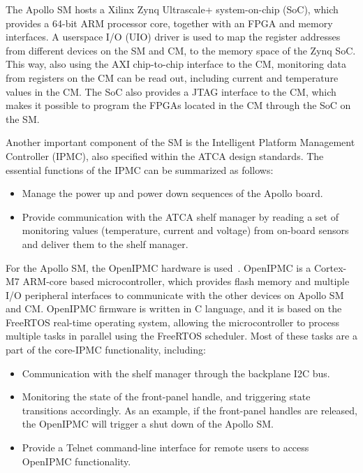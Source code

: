 The Apollo SM hosts a Xilinx Zynq Ultrascale+ system-on-chip (SoC),
which provides a 64-bit ARM processor core, together with an FPGA and memory interfaces. A userspace I/O (UIO) driver
is used to map the register addresses from different devices on the SM and CM, to the memory space of the Zynq SoC.
This way, also using the AXI chip-to-chip interface to the CM, monitoring data from registers on the CM 
can be read out, including current and temperature values in the CM. The SoC also provides a JTAG interface to the CM,
which makes it possible to program the FPGAs located in the CM through the SoC on the SM.

Another important component of the SM is the Intelligent Platform Management Controller (IPMC), also specified
within the ATCA design standards. The essential functions of the IPMC can be summarized as follows:

\begin{itemize}
    \item Manage the power up and power down sequences of the Apollo board.
    \item Provide communication with the ATCA shelf manager by reading a set of monitoring values 
    (temperature, current and voltage) from on-board sensors and deliver them to the shelf manager.
\end{itemize}

For the Apollo SM, the OpenIPMC hardware is used~\cite{Calligaris:OpenIPMC}. OpenIPMC is a
Cortex-M7 ARM-core based microcontroller, which provides flash memory and multiple I/O peripheral interfaces
to communicate with the other devices on Apollo SM and CM. OpenIPMC firmware is written in C language, and it is 
based on the FreeRTOS real-time operating system, allowing the microcontroller to process multiple tasks
in parallel using the FreeRTOS scheduler. Most of these tasks are a part of the core-IPMC functionality,
including:

\begin{itemize}
    \item Communication with the shelf manager through the backplane I2C bus.
    \item Monitoring the state of the front-panel handle, and triggering state transitions accordingly.
    As an example, if the front-panel handles are released, the OpenIPMC will trigger a shut down of the
    Apollo SM.
    \item Provide a Telnet command-line interface for remote users to access OpenIPMC functionality.
\end{itemize}

